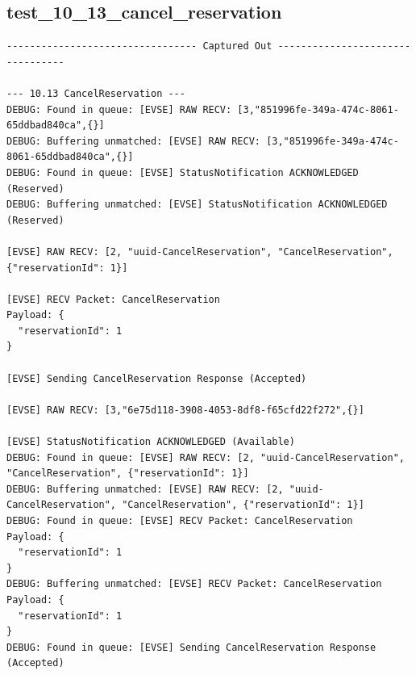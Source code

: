 \documentclass{article}
\begin{document}
\subsection*{test\_10\_13\_cancel\_reservation}
\begin{lstlisting}
--------------------------------- Captured Out ---------------------------------

--- 10.13 CancelReservation ---
DEBUG: Found in queue: [EVSE] RAW RECV: [3,"851996fe-349a-474c-8061-65ddbad840ca",{}]
DEBUG: Buffering unmatched: [EVSE] RAW RECV: [3,"851996fe-349a-474c-8061-65ddbad840ca",{}]
DEBUG: Found in queue: [EVSE] StatusNotification ACKNOWLEDGED (Reserved)
DEBUG: Buffering unmatched: [EVSE] StatusNotification ACKNOWLEDGED (Reserved)

[EVSE] RAW RECV: [2, "uuid-CancelReservation", "CancelReservation", {"reservationId": 1}]

[EVSE] RECV Packet: CancelReservation
Payload: {
  "reservationId": 1
}

[EVSE] Sending CancelReservation Response (Accepted)

[EVSE] RAW RECV: [3,"6e75d118-3908-4053-8df8-f65cfd22f272",{}]

[EVSE] StatusNotification ACKNOWLEDGED (Available)
DEBUG: Found in queue: [EVSE] RAW RECV: [2, "uuid-CancelReservation", "CancelReservation", {"reservationId": 1}]
DEBUG: Buffering unmatched: [EVSE] RAW RECV: [2, "uuid-CancelReservation", "CancelReservation", {"reservationId": 1}]
DEBUG: Found in queue: [EVSE] RECV Packet: CancelReservation
Payload: {
  "reservationId": 1
}
DEBUG: Buffering unmatched: [EVSE] RECV Packet: CancelReservation
Payload: {
  "reservationId": 1
}
DEBUG: Found in queue: [EVSE] Sending CancelReservation Response (Accepted)
\end{lstlisting}
\end{document}
